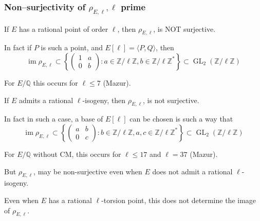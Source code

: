 \documentclass[10pt,final]{beamer} %
\newcommand{\Q}{\mathbb Q}
\newcommand{\Z}{\mathbb Z}
\theoremstyle{definition}
\begin{document}
\begin{frame}
\frametitle{Non--surjectivity of $\rho_{E,\ell}, \ell$ prime} 

If $E$ has a \alert{rational point of order $\ell$}, then $\rho_{E,\ell}$, is NOT surjective.\pause

In fact if $P$ is such a point, and $E[\ell]=\langle P, Q\rangle$, then 
$$\operatorname{im}\rho_{E,\ell}\subset
\left\{\begin{pmatrix}
 1& a\\ 0& b  
  \end{pmatrix}: a\in \Z/\ell \Z, b\in\Z/\ell \Z^*\right\}
\subset\operatorname{GL}_2 (\Z/\ell \Z)$$\pause

For $E/\Q$ this occurs for $\ell\le 7$ (Mazur).\pause

If $E$ admits a \alert{rational $\ell$-isogeny}, then $\rho_{E,\ell}$, is not surjective.\pause

In fact in such a case, a base of $E[\ell]$ can be chosen is such a way that 
$$\operatorname{im}\rho_{E,\ell}\subset
\left\{\begin{pmatrix}
 a& b\\ 0& c  
  \end{pmatrix}: b\in \Z/\ell \Z, a,c\in\Z/\ell \Z^*\right\}
\subset\operatorname{GL}_2 (\Z/\ell \Z)$$\pause


For $E/\Q$ without CM, this occurs for $\ell\le 17$ and $\ell = 37$ (Mazur).\pause

But $\rho_{E,\ell}$, may be non-surjective even when $E$ does not admit a
rational $\ell$-isogeny.\pause

Even when $E$ has a rational $\ell$-torsion point,
this does not determine the image of $\rho_{E,\ell}$.
\end{frame}
\end{document}
